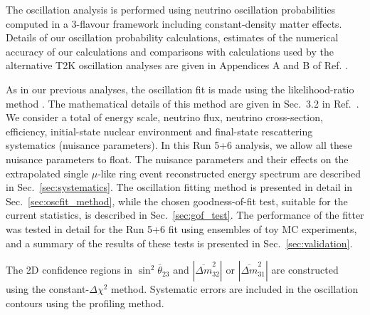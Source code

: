 The oscillation analysis is performed using neutrino oscillation probabilities computed in a 3-flavour
framework including constant-density matter effects. 
Details of our oscillation probability calculations, estimates of the numerical accuracy of our
calculations and comparisons with calculations used by the alternative T2K oscillation analyses 
are given in Appendices A and B of Ref. \cite{OurRun123DisappAnalysis3Flavour}.

As in our previous analyses, the oscillation fit is made using the likelihood-ratio method \cite{StatAnalysisCowan}.
The mathematical details of this method are given in Sec.\ 3.2 in Ref.\ \cite{OurRun1DisappAnalysis}.
We consider a total of \NSyst{} energy scale, neutrino flux, neutrino cross-section,
efficiency, initial-state nuclear environment and final-state rescattering systematics (nuisance parameters).
In this Run 5+6 analysis, we allow all these nuisance parameters to float.
The nuisance parameters and their effects 
on the extrapolated single $\mu$-like ring event reconstructed energy spectrum are described in Sec.~\ref{sec:systematics}.
The oscillation fitting method is presented in detail in Sec.~\ref{sec:oscfit_method},
while the chosen goodness-of-fit test, suitable for the current statistics, is described in Sec.~\ref{sec:gof_test}.
The performance of the fitter was tested in detail for the Run 5+6 fit using ensembles of toy MC experiments, and
a summary of the results of these tests is presented in Sec.~\ref{sec:validation}. 

The 2D confidence regions in $\sin^{2}\overline{\theta}_{23}$ and $|\overline{\Delta m}^{2}_{32}|$ 
or $|\overline{\Delta m}^{2}_{31}|$ 
are constructed using the constant-$\Delta \chi^{2}$
method. 
Systematic errors are included in the oscillation contours using the profiling method.

